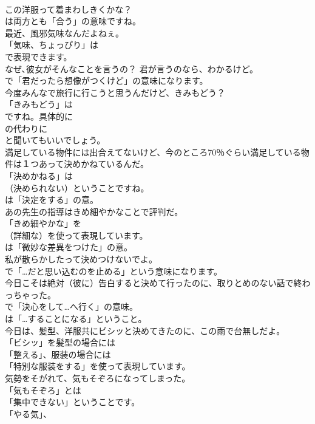 \documentclass[8pt]{extreport}
\begin{document}
\begin{CJK}{UTF8}{min}
\\	この洋服って着まわしきくかな？ 
\\	は両方とも「合う」の意味ですね。	
\\	最近、風邪気味なんだよねぇ。 
\\	「気味、ちょっぴり」は
\\	で表現できます。	
\\	なぜ､彼女がそんなことを言うの？ 君が言うのなら、わかるけど。 
\\	で「君だったら想像がつくけど」の意味になります。	
\\	今度みんなで旅行に行こうと思うんだけど、きみもどう？ 
\\	「きみもどう」は 
\\	ですね。具体的に 
\\	の代わりに 
\\	と聞いてもいいでしょう。	
\\	満足している物件には出合えてないけど、今のところ70％ぐらい満足している物件は１つあって決めかねているんだ。 
\\	「決めかねる」は 
\\	（決められない）ということですね。
\\	は「決定をする」の意。	
\\	あの先生の指導はきめ細やかなことで評判だ。 
\\	「きめ細やかな」を 
\\	（詳細な）を使って表現しています。
\\	は「微妙な差異をつけた」の意。	
\\	私が散らかしたって決めつけないでよ。 
\\	で「…だと思い込むのを止める」という意味になります。	
\\	今日こそは絶対（彼に）告白すると決めて行ったのに、取りとめのない話で終わっちゃった。 
\\	で「決心をして…へ行く」の意味。
\\	は「…することになる」ということ。	
\\	今日は、髪型、洋服共にビシッと決めてきたのに、この雨で台無しだよ。 
\\	「ビシッ」を髪型の場合には
\\	「整える」、服装の場合には
\\	「特別な服装をする」を使って表現しています。	
\\	気勢をそがれて、気もそぞろになってしまった。 
\\	「気もそぞろ」とは
\\	「集中できない」ということです。
\\	「やる気」、

\end{CJK}
\end{document}
